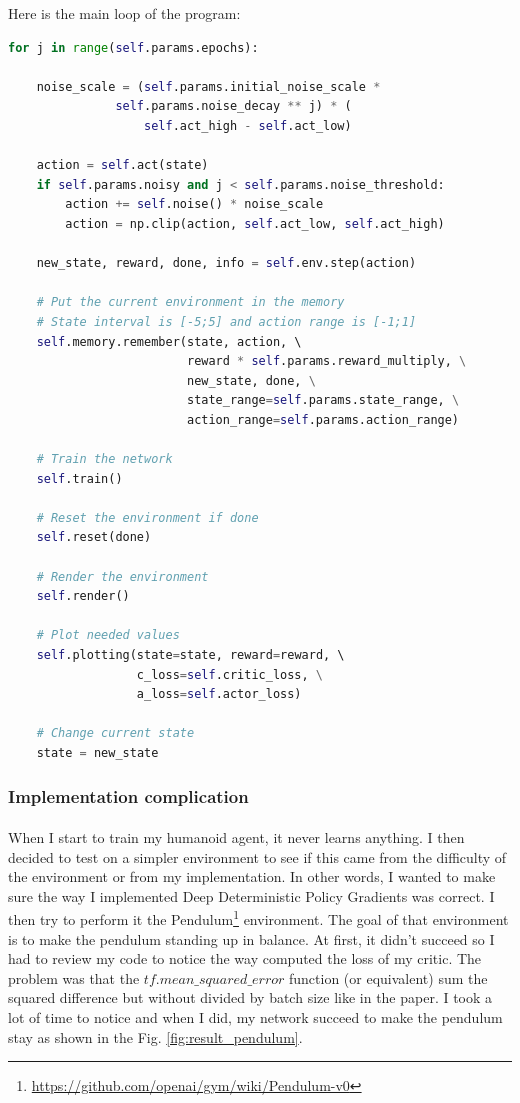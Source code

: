 \documentclass{article}
\begin{document}
Here is the main loop of the program:

\begin{lstlisting}[language=Python]
for j in range(self.params.epochs):

    noise_scale = (self.params.initial_noise_scale *
               self.params.noise_decay ** j) * (
                   self.act_high - self.act_low)

    action = self.act(state)
    if self.params.noisy and j < self.params.noise_threshold:
        action += self.noise() * noise_scale
        action = np.clip(action, self.act_low, self.act_high)

    new_state, reward, done, info = self.env.step(action)

    # Put the current environment in the memory
    # State interval is [-5;5] and action range is [-1;1]
    self.memory.remember(state, action, \ 
                         reward * self.params.reward_multiply, \
                         new_state, done, \
                         state_range=self.params.state_range, \
                         action_range=self.params.action_range)

    # Train the network
    self.train()

    # Reset the environment if done
    self.reset(done)

    # Render the environment
    self.render()

    # Plot needed values
    self.plotting(state=state, reward=reward, \ 
                  c_loss=self.critic_loss, \
                  a_loss=self.actor_loss)

    # Change current state
    state = new_state
\end{lstlisting}


\subsubsection{Implementation complication}

\paragraph{}
When I start to train my humanoid agent, it never learns anything. I then
decided to test on a simpler environment to see if this came from the difficulty
of the environment or from my implementation. In other words, I wanted to make
sure the way I implemented Deep Deterministic Policy Gradients was correct. I
then try to perform it the
Pendulum\footnote{\url{https://github.com/openai/gym/wiki/Pendulum-v0}}
environment. The goal of that environment is to make the pendulum standing up in
balance. At first, it didn't succeed so I had to review my code to notice the
way computed the loss of my critic. The problem was that the
$tf.mean\_squared\_error$ function (or equivalent) sum the squared difference
but without divided by batch size like in the paper. I took a lot of time to
notice and when I did, my network succeed to make the pendulum stay as shown in
the Fig. \ref{fig:result_pendulum}.
\end{document}
